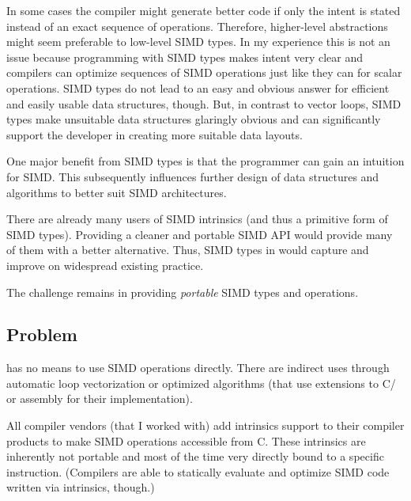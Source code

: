 In some cases the compiler might generate better code if only the intent is stated instead of an exact sequence of operations.
Therefore, higher-level abstractions might seem preferable to low-level SIMD types.
In my experience this is not an issue because programming with SIMD types makes intent very clear and compilers can optimize sequences of SIMD operations just like they can for scalar operations.
SIMD types do not lead to an easy and obvious answer for efficient and easily usable data structures, though.
But, in contrast to vector loops, SIMD types make unsuitable data structures glaringly obvious and can significantly support the developer in creating more suitable data layouts.

One major benefit from SIMD types is that the programmer can gain an intuition for SIMD.
This subsequently influences further design of data structures and algorithms to better suit SIMD architectures.

There are already many users of SIMD intrinsics (and thus a primitive form of SIMD types).
Providing a cleaner and portable SIMD API would provide many of them with a better alternative.
Thus, SIMD types in \CC{} would capture and improve on widespread existing practice.

The challenge remains in providing \emph{portable} SIMD types and operations.

\subsection{Problem}
\CC{} has no means to use SIMD operations directly.
There are indirect uses through automatic loop vectorization or optimized algorithms (that use extensions to C/\CC{} or assembly for their implementation).

All compiler vendors (that I worked with) add intrinsics support to their compiler products to make SIMD operations accessible from C.
These intrinsics are inherently not portable and most of the time very directly bound to a specific instruction.
(Compilers are able to statically evaluate and optimize SIMD code written via intrinsics, though.)

